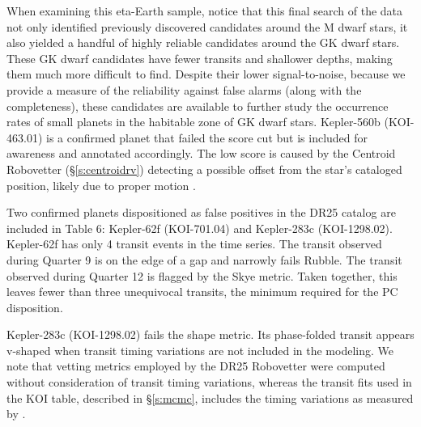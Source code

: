 {\color{blue}
When examining this eta-Earth sample, notice that this final search of the \Kepler{} data not only identified previously discovered candidates around the M dwarf stars, it also yielded a handful of highly reliable candidates around the GK dwarf stars. These GK dwarf candidates have fewer transits and shallower depths, making them much more difficult to find.  Despite their lower signal-to-noise, because we provide a measure of the reliability against false alarms (along with the completeness), these candidates are available to further study the occurrence rates of small planets in the habitable zone of GK dwarf stars.
}
Kepler-560b (KOI-463.01) is a confirmed planet that failed the score cut but is included for awareness and annotated accordingly.  The low score is caused by the Centroid Robovetter (\S\ref{s:centroidrv}) detecting a possible offset from the star's cataloged position, likely due to proper motion \citep{Mann2017}.  

Two confirmed planets dispositioned as false positives in the DR25 catalog are included in Table 6: Kepler-62f (KOI-701.04) and Kepler-283c (KOI-1298.02).  Kepler-62f has only 4 transit events in the time series.  The transit observed during Quarter 9 is on the edge of a gap and narrowly fails Rubble.  The transit observed during Quarter 12 is flagged by the Skye metric.  Taken together, this leaves fewer than three unequivocal transits, the minimum required for the PC disposition. 

Kepler-283c (KOI-1298.02) fails the shape metric.  Its phase-folded transit appears v-shaped when transit timing variations are not included in the modeling.  We note that vetting metrics employed by the DR25 Robovetter were computed without consideration of transit timing variations, whereas the transit fits used in the KOI table, described in \S\ref{s:mcmc}, includes the timing variations as measured by \citet{Rowe2015cat}. 




